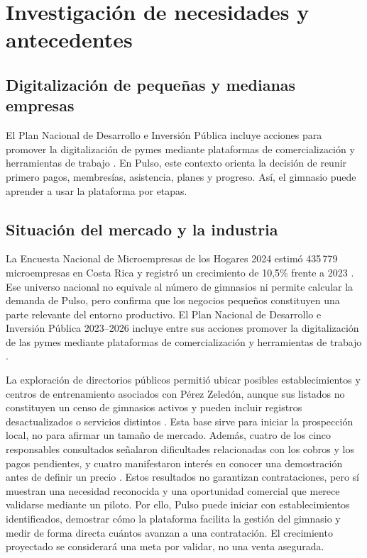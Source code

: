 \section{Investigación de necesidades y antecedentes}

\subsection{Digitalización de pequeñas y medianas empresas}

El Plan Nacional de Desarrollo e Inversión Pública incluye acciones para
promover la digitalización de pymes mediante plataformas de comercialización y
herramientas de trabajo \parencite{meic_pndip2023_2026}. En Pulso, este contexto
orienta la decisión de reunir primero pagos, membresías, asistencia, planes y
progreso. Así, el gimnasio puede aprender a usar la plataforma por etapas.

\subsection{Situación del mercado y la industria}

La Encuesta Nacional de Microempresas de los Hogares 2024 estimó 435\,779
microempresas en Costa Rica y registró un crecimiento de 10,5\% frente a 2023
\parencite{inec_enameh2024}. Ese universo nacional no equivale al número de
gimnasios ni permite calcular la demanda de Pulso, pero confirma que los
negocios pequeños constituyen una parte relevante del entorno productivo. El
Plan Nacional de Desarrollo e Inversión Pública 2023--2026 incluye entre sus
acciones promover la digitalización de las pymes mediante plataformas de
comercialización y herramientas de trabajo \parencite{meic_pndip2023_2026}.

La exploración de directorios públicos permitió ubicar posibles establecimientos
y centros de entrenamiento asociados con Pérez Zeledón, aunque sus listados no
constituyen un censo de gimnasios activos y pueden incluir registros
desactualizados o servicios distintos \parencite{cybo_gimnasios_san_isidro}. Esta
base sirve para iniciar la prospección local, no para afirmar un tamaño de
mercado. Además, cuatro de los cinco responsables consultados señalaron
dificultades relacionadas con los cobros y los pagos pendientes, y cuatro
manifestaron interés en conocer una demostración antes de definir un precio
\parencite{encuesta_gymhub_2026}. Estos resultados no garantizan contrataciones,
pero sí muestran una necesidad reconocida y una oportunidad comercial que
merece validarse mediante un piloto. Por ello, Pulso puede iniciar con
establecimientos identificados, demostrar cómo la plataforma facilita la
gestión del gimnasio y medir de forma directa cuántos avanzan a una contratación.
El crecimiento proyectado se considerará una meta por validar, no una venta
asegurada.


